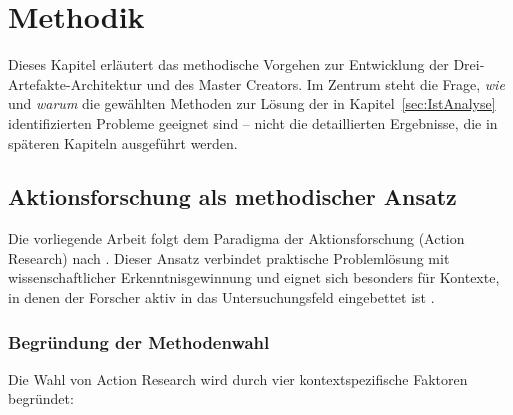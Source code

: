 \section{Methodik}
\label{sec:Methodik}


Dieses Kapitel erläutert das methodische Vorgehen zur Entwicklung der Drei-Artefakte-Architektur und des Master Creators. Im Zentrum steht die Frage, \textit{wie} und \textit{warum} die gewählten Methoden zur Lösung der in Kapitel~\ref{sec:IstAnalyse} identifizierten Probleme geeignet sind -- nicht die detaillierten Ergebnisse, die in späteren Kapiteln ausgeführt werden.


\subsection{Aktionsforschung als methodischer Ansatz}
\label{subsec:Aktionsforschung}

Die vorliegende Arbeit folgt dem Paradigma der Aktionsforschung (Action Research) nach \cite{lewin:action_research1946}. Dieser Ansatz verbindet praktische Problemlösung mit wissenschaftlicher Erkenntnisgewinnung und eignet sich besonders für Kontexte, in denen der Forscher aktiv in das Untersuchungsfeld eingebettet ist \citep{reason:handbook_action_research2001}.

\subsubsection{Begründung der Methodenwahl}
\label{subsubsec:BegruendungMethode}

Die Wahl von Action Research wird durch vier kontextspezifische Faktoren begründet:

